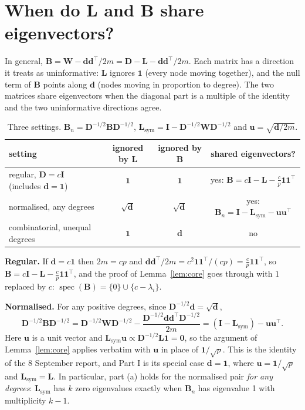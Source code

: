 \documentclass[11pt,a4paper]{article}
\newcommand{\Lap}{\mathbf{L}}
\newcommand{\Wmat}{\mathbf{W}}
\newcommand{\Bmat}{\mathbf{B}}
\newcommand{\Dmat}{\mathbf{D}}
\newcommand{\Imat}{\mathbf{I}}
\newcommand{\dvec}{\mathbf{d}}
\newcommand{\uvec}{\mathbf{u}}
\newcommand{\one}{\mathbf{1}}
\newcommand{\Lsym}{\Lap_{\mathrm{sym}}}
\theoremstyle{remark}
\begin{document}
\section{When do $\Lap$ and $\Bmat$ share eigenvectors?}\label{sec:classify}

In general, $\Bmat=\Wmat-\dvec\dvec^\top/2m=\Dmat-\Lap-\dvec\dvec^\top/2m$. Each
matrix has a direction it treats as uninformative: $\Lap$ ignores $\one$ (every node
moving together), and the null term of $\Bmat$ points along $\dvec$ (nodes moving in
proportion to degree). The two matrices share eigenvectors when the diagonal
part is a multiple of the identity and the two uninformative directions agree.

\begin{table}[h]
\centering\small
\begin{tabular}{lccc}
\toprule
setting & ignored by $\Lap$ & ignored by $\Bmat$ & shared eigenvectors? \\
\midrule
regular, $\Dmat=c\Imat$ (includes $\dvec=\one$) & $\one$ & $\one$ &
  yes: $\Bmat=c\Imat-\Lap-\tfrac cp\one\one^\top$ \\
normalised, any degrees & $\sqrt{\dvec}$ & $\sqrt{\dvec}$ &
  yes: $\Bmat_n=\Imat-\Lsym-\uvec\uvec^\top$ \\
combinatorial, unequal degrees & $\one$ & $\dvec$ & no \\
\bottomrule
\end{tabular}
\caption{Three settings. $\Bmat_n=\Dmat^{-1/2}\Bmat\Dmat^{-1/2}$,
$\Lsym=\Imat-\Dmat^{-1/2}\Wmat\Dmat^{-1/2}$ and $\uvec=\sqrt{\dvec/2m}$.}
\label{tab:classify}
\end{table}

\textbf{Regular.} If $\dvec=c\one$ then $2m=cp$ and
$\dvec\dvec^\top/2m=c^2\one\one^\top/(cp)=\tfrac cp\one\one^\top$, so
$\Bmat=c\Imat-\Lap-\tfrac cp\one\one^\top$, and the proof of Lemma~\ref{lem:core}
goes through with $1$ replaced by $c$: $\operatorname{spec}(\Bmat)=\{0\}\cup\{c-\lambda_i\}$.

\textbf{Normalised.} For any positive degrees, since $\Dmat^{-1/2}\dvec=\sqrt{\dvec}$,
\[
  \Dmat^{-1/2}\Bmat\Dmat^{-1/2}=\Dmat^{-1/2}\Wmat\Dmat^{-1/2}
  -\frac{\Dmat^{-1/2}\dvec\dvec^\top\Dmat^{-1/2}}{2m}=(\Imat-\Lsym)-\uvec\uvec^\top .
\] Here $\uvec$ is a unit vector and
$\Lsym\uvec\propto\Dmat^{-1/2}\Lap\one=\mathbf 0$, so the argument of
Lemma~\ref{lem:core} applies verbatim with $\uvec$ in place of $\one/\sqrt p$. This is
the identity of the 8 September report, and Part I is its special case $\dvec=\one$,
where $\uvec=\one/\sqrt p$ and $\Lsym=\Lap$. In particular, part (a) holds for the
normalised pair \emph{for any degrees}: $\Lsym$ has $k$ zero eigenvalues exactly when
$\Bmat_n$ has eigenvalue 1 with multiplicity $k-1$.
\end{document}
